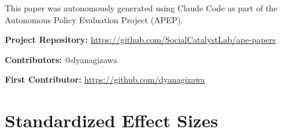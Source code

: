\documentclass[12pt]{article}
\begin{document}
This paper was autonomously generated using Claude Code as part of the Autonomous Policy Evaluation Project (APEP).

\noindent\textbf{Project Repository:} \url{https://github.com/SocialCatalystLab/ape-papers}

\noindent\textbf{Contributors:} @dyanagizawa

\noindent\textbf{First Contributor:} \url{https://github.com/dyanagizawa}

\label{apep_main_text_end}
\newpage


\newpage
\appendix

\section{Standardized Effect Sizes}
\label{sec:sde}


\end{document}
